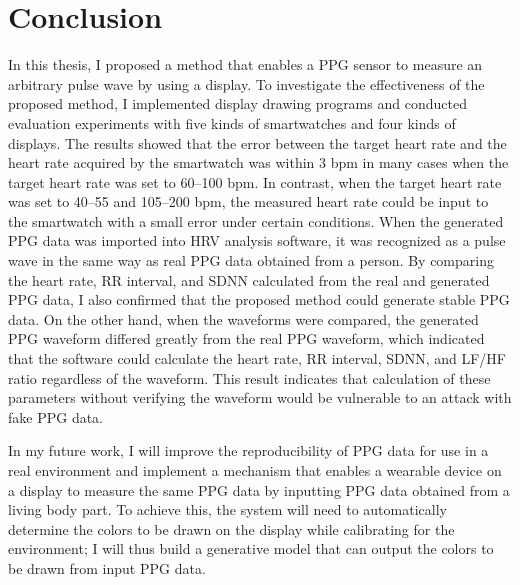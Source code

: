 \chapter{Conclusion}
\label{sec:conclusion}
In this thesis, I proposed a method that enables a PPG sensor to measure an arbitrary pulse wave by using a display. To investigate the effectiveness of the proposed method, I implemented display drawing programs and conducted evaluation experiments with five kinds of smartwatches and four kinds of displays. The results showed that the error between the target heart rate and the heart rate acquired by the smartwatch was within $3$ bpm in many cases when the target heart rate was set to 60--100 bpm. In contrast, when the target heart rate was set to 40--55 and 105--200 bpm, the measured heart rate could be input to the smartwatch with a small error under certain conditions. When the generated PPG data was imported into HRV analysis software, it was recognized as a pulse wave in the same way as real PPG data obtained from a person. By comparing the heart rate, RR interval, and SDNN calculated from the real and generated PPG data, I also confirmed that the proposed method could generate stable PPG data. On the other hand, when the waveforms were compared, the generated PPG waveform differed greatly from the real PPG waveform, which indicated that the software could calculate the heart rate, RR interval, SDNN, and LF/HF ratio regardless of the waveform. This result indicates that calculation of these parameters without verifying the waveform would be vulnerable to an attack with fake PPG data.\par

In my future work, I will improve the reproducibility of PPG data for use in a real environment and implement a mechanism that enables a wearable device on a display to measure the same PPG data by inputting PPG data obtained from a living body part. To achieve this, the system will need to automatically determine the colors to be drawn on the display while calibrating for the environment; I will thus build a generative model that can output the colors to be drawn from input PPG data.
